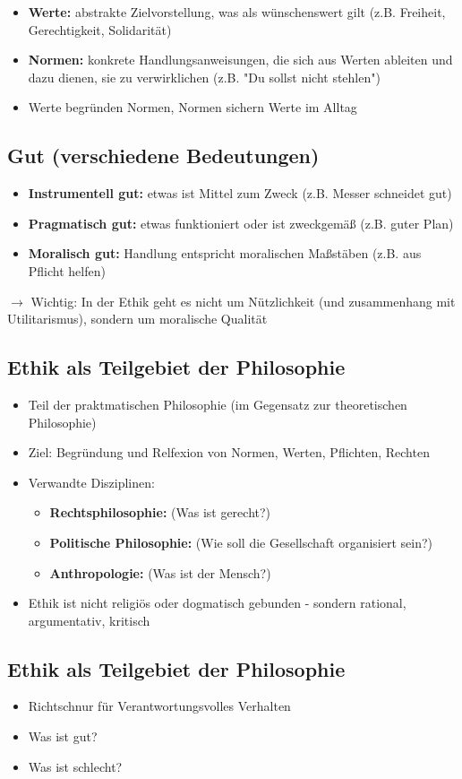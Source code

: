 \begin{itemize}
    \item \textbf{Werte:} abstrakte Zielvorstellung, was als wünschenswert gilt (z.B. Freiheit, Gerechtigkeit, Solidarität)
    \item \textbf{Normen:} konkrete Handlungsanweisungen, die sich aus Werten ableiten und dazu dienen, sie zu verwirklichen (z.B. "Du sollst nicht stehlen")
    \item Werte begründen Normen, Normen sichern Werte im Alltag
\end{itemize}

\subsection{Gut (verschiedene Bedeutungen)}

\begin{itemize}
    \item \textbf{Instrumentell gut:} etwas ist Mittel zum Zweck (z.B. Messer schneidet gut)
    \item \textbf{Pragmatisch gut:} etwas funktioniert oder ist zweckgemäß (z.B. guter Plan)
    \item \textbf{Moralisch gut:} Handlung entspricht moralischen Maßstäben (z.B. aus Pflicht helfen)
\end{itemize}

$\rightarrow$ Wichtig: In der Ethik geht es nicht um Nützlichkeit (und zusammenhang mit Utilitarismus), sondern um moralische Qualität

\subsection{Ethik als Teilgebiet der Philosophie}
\begin{itemize}
    \item Teil der praktmatischen Philosophie (im Gegensatz zur theoretischen Philosophie)
    \item Ziel: Begründung und Relfexion von Normen, Werten, Pflichten, Rechten
    \item Verwandte Disziplinen:
    \begin{itemize}
        \item \textbf{Rechtsphilosophie:} (Was ist gerecht?)
        \item \textbf{Politische Philosophie:} (Wie soll die Gesellschaft organisiert sein?)
        \item \textbf{Anthropologie:} (Was ist der Mensch?)
    \end{itemize}
    \item Ethik ist nicht religiös oder dogmatisch gebunden - sondern rational, argumentativ, kritisch
\end{itemize}


\subsection{Ethik als Teilgebiet der Philosophie}
\begin{itemize}
    \item Richtschnur für Verantwortungsvolles Verhalten
    \item Was ist gut?
    \item Was ist schlecht?
\end{itemize}


